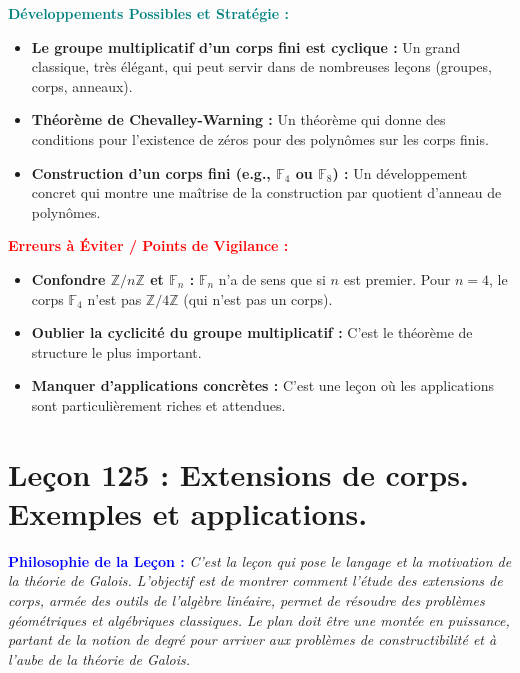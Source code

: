 \documentclass[12pt, a4paper, parskip=full]{report}
\theoremstyle{agregstyle}
\newenvironment{philosophie}
  {\par\medskip\noindent\begin{oframed}\noindent\textbf{\textcolor{blue}{Philosophie de la Leçon :}}\itshape}
  {\end{oframed}\par\medskip}
\newenvironment{developpements}
  {\par\medskip\noindent\begin{oframed}\noindent\textbf{\textcolor{teal}{Développements Possibles et Stratégie :}}}
  {\end{oframed}\par\medskip}
\newenvironment{erreurs}
  {\par\medskip\noindent\begin{oframed}\noindent\textbf{\textcolor{red}{Erreurs à Éviter / Points de Vigilance :}}}
  {\end{oframed}\par\medskip}
\begin{document}
\begin{developpements}
    \begin{itemize}
        \item \textbf{Le groupe multiplicatif d'un corps fini est cyclique :} Un grand classique, très élégant, qui peut servir dans de nombreuses leçons (groupes, corps, anneaux).
        \item \textbf{Théorème de Chevalley-Warning :} Un théorème qui donne des conditions pour l'existence de zéros pour des polynômes sur les corps finis.
        \item \textbf{Construction d'un corps fini (e.g., $\mathbb{F}_4$ ou $\mathbb{F}_8$) :} Un développement concret qui montre une maîtrise de la construction par quotient d'anneau de polynômes.
    \end{itemize}
\end{developpements}

\begin{erreurs}
    \begin{itemize}
        \item \textbf{Confondre $\mathbb{Z}/n\mathbb{Z}$ et $\mathbb{F}_n$ :} $\mathbb{F}_n$ n'a de sens que si $n$ est premier. Pour $n=4$, le corps $\mathbb{F}_4$ n'est pas $\mathbb{Z}/4\mathbb{Z}$ (qui n'est pas un corps).
        \item \textbf{Oublier la cyclicité du groupe multiplicatif :} C'est le théorème de structure le plus important.
        \item \textbf{Manquer d'applications concrètes :} C'est une leçon où les applications sont particulièrement riches et attendues.
    \end{itemize}
\end{erreurs}

\newpage
\chapter{Leçon 125 : Extensions de corps. Exemples et applications.}

\begin{philosophie}
    C'est la leçon qui pose le langage et la motivation de la théorie de Galois. L'objectif est de montrer comment l'étude des extensions de corps, armée des outils de l'algèbre linéaire, permet de résoudre des problèmes géométriques et algébriques classiques. Le plan doit être une montée en puissance, partant de la notion de degré pour arriver aux problèmes de constructibilité et à l'aube de la théorie de Galois.
\end{philosophie}
\end{document}
